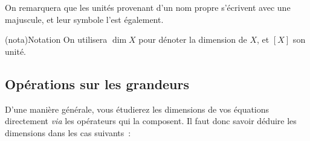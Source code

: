 \documentclass[../main/main.tex]{subfiles}
\begin{document}
On remarquera que les unités provenant d'un nom propre s'écrivent avec une
majuscule, et leur symbole l'est également.

\begin{tcb}(nota){Notation}
	On utilisera $\dim{X}$ pour dénoter la dimension de $X$, et $[X]$ son unité.
\end{tcb}

\subsection{Opérations sur les grandeurs}
D'une manière générale, vous étudierez les dimensions de vos équations
directement \textit{via} les opérateurs qui la composent. Il faut donc savoir
déduire les dimensions dans les cas suivants~:
\end{document}
